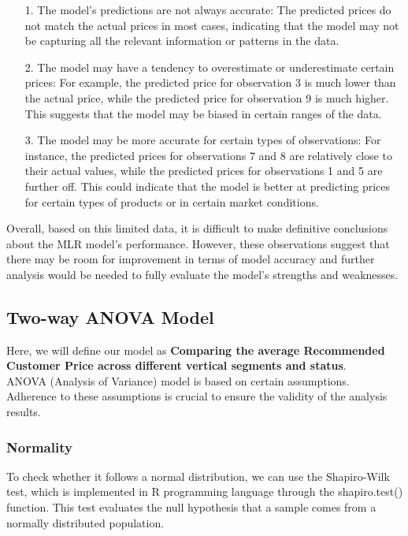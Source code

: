 \documentclass[a4paper]{article}
\begin{document}
	\begin{itemize}
	\item [1.]The model's predictions are not always accurate: The predicted prices do not match the actual prices in most cases, indicating that the model may not be capturing all the relevant information or patterns in the data.
	\item [2.]The model may have a tendency to overestimate or underestimate certain prices: For example, the predicted price for observation 3 is much lower than the actual price, while the predicted price for observation 9 is much higher. This suggests that the model may be biased in certain ranges of the data.
	\item [3.]The model may be more accurate for certain types of observations: For instance, the predicted prices for observations 7 and 8 are relatively close to their actual values, while the predicted prices for observations 1 and 5 are further off. This could indicate that the model is better at predicting prices for certain types of products or in certain market conditions.
	\end{itemize}

	
	Overall, based on this limited data, it is difficult to make definitive conclusions about the MLR model's performance. However, these observations suggest that there may be room for improvement in terms of model accuracy and further analysis would be needed to fully evaluate the model's strengths and weaknesses.
	\newpage
	\subsection{Two-way ANOVA Model}
	Here, we will define our model as \textbf{Comparing the average Recommended Customer Price across different vertical segments and status}.\\ ANOVA (Analysis of Variance) model is based on certain assumptions. Adherence to these assumptions is crucial to ensure the validity of the analysis results.
	\subsubsection{Normality}
	To check whether it follows a normal distribution, we can use the Shapiro-Wilk test, which is implemented in R programming language through the shapiro.test() function. This test evaluates the null hypothesis that a sample comes from a normally distributed population.
\end{document}
